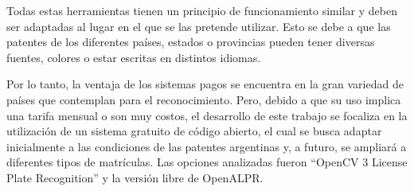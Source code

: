 Todas estas herramientas tienen un principio de funcionamiento similar y deben ser adaptadas al lugar en el que se las pretende utilizar. Esto se debe a que las patentes de los diferentes países, estados o provincias pueden tener diversas fuentes, colores o estar escritas en distintos idiomas.

Por lo tanto, la ventaja de los sistemas pagos se encuentra en la gran variedad de países que contemplan para el reconocimiento. Pero, debido a que su uso implica una tarifa mensual o son muy costos, el desarrollo de este trabajo se focaliza en la utilización de un sistema gratuito de código abierto, el cual se busca adaptar inicialmente a las condiciones de las patentes argentinas y, a futuro, se ampliará a diferentes tipos de matrículas. Las opciones analizadas fueron ``OpenCV 3 License Plate Recognition'' y la versión libre de OpenALPR.


